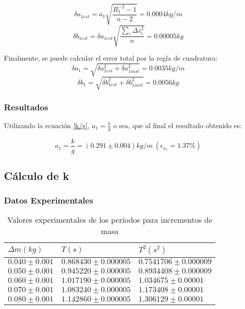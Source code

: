 \documentclass[a4paper,12pt]{article}
\begin{document}
$$\delta a_{1est }= a_1\sqrt{\frac{R_1^{-2}-1}{n-2}} =0.0004 kg/m$$ 
$$\delta b_{1est} = \delta a_{1est}\sqrt{\frac{\sum_i\Delta z_i^2}{n}} = 0.00005 kg$$

Finalmente, se puede calcular el error total por la regla de cuadratura:
$$\delta a_1 = \sqrt{\delta a_{1est}^2 + \delta a_{1inst}^2} = 0.0035 kg/m
$$$$\delta b_1 = \sqrt{\delta b_{1est}^2 + \delta b_{1inst}^2} = 0.0056 kg$$ 

\subsubsection{Resultados}
Utilizando la ecuación \eqref{k/g}, $a_1 = \frac{k}{g}$ o sea, que al final el resultado obtenido es:

\begin{tcolorbox}
    \begin{equation}
      a_1 =\frac{k}{g} = (0.291 \pm 0.004) kg/m \ (\epsilon_{a_1}=1.37\%)
      \label{a1}
    \end{equation}
\end{tcolorbox}

\subsection{Cálculo de k}

\subsubsection{Datos Experimentales}
\begin{table}[h!]
  \centering
  \caption{Valores experimentales de los períodos para incrementos de masa}
  \begin{tabular}{|l|l|l|}
    \hline
    $\Delta m (kg)$ & $T(s)$ & $T^2 (s^2)$\\
    \hline
    $0.040 \pm 0.001$ & $0.868430 \pm 0.000005$ & $0.7541706\pm 0.000009$\\
    \hline
    $0.050 \pm 0.001$ & $0.945220 \pm 0.000005$ & $0.8934408\pm 0.000009$\\
    \hline
    $0.060 \pm 0.001$ & $1.017190 \pm 0.000005$ & $1.034675\pm 0.00001$\\
    \hline
    $0.070 \pm 0.001$ & $1.083240 \pm 0.000005$ & $1.173408\pm 0.00001$\\
    \hline
    $0.080 \pm 0.001$ & $1.142860 \pm 0.000005$ & $1.306129\pm 0.00001$\\
    \hline
  \end{tabular}
\end{table}
\pagebreak
\end{document}
